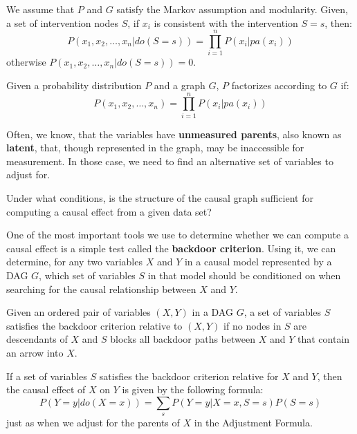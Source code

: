 \begin{definition}
      We assume that $P$ and $G$ satisfy the Markov assumption and modularity.
      Given, a set of intervention nodes $S$, if $x_i$ is consistent with the
      intervention $S = s$, then:
      \begin{equation}
            P(x_1, x_2, \dots, x_n| do(S = s)) = \prod_{i = 1}^{n} P(x_i | pa(x_i))
      \end{equation}
      otherwise $P(x_1, x_2, \dots, x_n| do(S = s)) = 0$.
\end{definition}
\begin{definition}
      Given a probability distribution $P$ and a graph $G$, $P$ factorizes
      according to $G$ if:
      \begin{equation}
            P(x_1, x_2, \dots, x_n) = \prod_{i = 1}^{n} P(x_i | pa(x_i))
      \end{equation}
\end{definition}
Often, we know, that the variables have \textbf{unmeasured parents}, also known as
\textbf{latent}, that, though represented in the graph, may be inaccessible for
measurement. In those case, we need to find an alternative set of variables
to adjust for.

\begin{center}
      Under what conditions, is the structure of the causal graph sufficient for
      computing a causal effect from a given data set?
\end{center}

One of the most important tools we use to determine whether we can compute a
causal effect is a simple test called the \textbf{backdoor criterion}. Using it,
we can determine, for any two variables $X$ and $Y$ in a causal model represented
by a DAG $G$, which set of variables $S$ in that model should be conditioned on
when searching for the causal relationship between $X$ and $Y$.

\begin{definition}
      Given an ordered pair of variables $(X, Y)$ in a DAG $G$, a set of variables
      $S$ satisfies the backdoor criterion relative to $(X, Y)$ if no nodes
      in $S$ are descendants of $X$ and $S$ blocks all backdoor paths between $X$
      and $Y$ that contain an arrow into $X$.
\end{definition}
If a set of variables $S$ satisfies the backdoor criterion relative for $X$ and
$Y$, then the causal effect of $X$ on $Y$ is given by the following formula:
\begin{equation}
      P(Y = y| do(X = x)) = \sum_{s} P(Y = y| X = x, S = s)P(S = s)
\end{equation}
just as when we adjust for the parents of $X$ in the Adjustment Formula.


